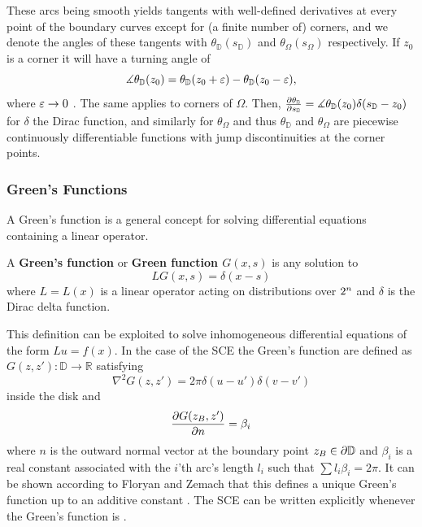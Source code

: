 These arcs being smooth yields tangents with well-defined derivatives at every point of the boundary curves except for (a finite number of) corners, and we denote the angles of these tangents with $\theta_{\mathbb{D}}(s_{\mathbb{D}})$ and $\theta_{\Omega}(s_{\Omega})$ respectively. If $z_0$ is a corner it will have a turning angle of 
$$\measuredangle\theta_{\mathbb{D}}(z_0)=\theta_{\mathbb{D}}(z_0+\varepsilon)-\theta_{\mathbb{D}}(z_0-\varepsilon),$$ 
where $\varepsilon\to0$ . The same applies to corners of $\Omega$. Then,
$\frac{\partial\theta_{\mathbb{D}}}{\partial s_{\mathbb{D}}} = \measuredangle\theta_{\mathbb{D}}(z_0)\delta(s_{\mathbb{D}}-z_0)$ for $\delta$ the Dirac function, and similarly for $\theta_{\Omega}$ and thus $\theta_{\mathbb{D}}$ and $\theta_{\Omega}$ are piecewise continuously differentiable functions with jump discontinuities at the corner points.


\subsubsection{Green's Functions}
A Green's function is a general concept for solving differential equations containing a linear operator.
\begin{definition} 
    A \textbf{Green's function} or \textbf{Green function $G(x,s)$} is any solution to $$LG(x,s)=\delta(x-s)$$ where $L=L(x)$ is a linear operator acting on distributions over $2^{n}$ and $\delta$ is the Dirac delta function.
\end{definition}
This definition can be exploited to solve inhomogeneous differential equations of the form $Lu=f(x)$.
In the case of the SCE the Green's function are defined as $G(z,z'):\mathbb{D}\to\mathbb{R}$ satisfying $$\nabla^2 G(z,z') = 2\pi \delta(u-u')\delta(v-v') $$ inside the disk and $$\frac{\partial G(z_B, z')}{\partial n} = \beta_i$$ where $n$ is the outward normal vector at the boundary point $z_B \in \partial\mathbb{D}$ and $\beta_i$ is a real constant associated with the $i$'th arc's length $l_i$ such that $\sum l_i\beta_i = 2\pi$. It can be shown according to Floryan and Zemach that this defines a unique Green's function up to an additive constant \cite{FLORYAN1987_SC_general}.
The SCE can be written explicitly whenever the Green's function is .


